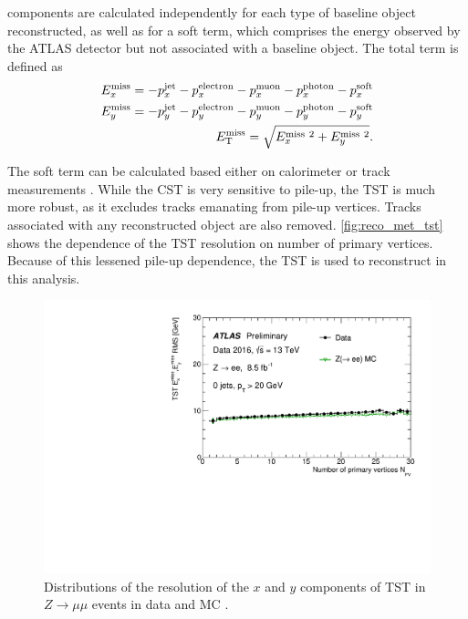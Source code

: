 \met components are calculated independently for each type of baseline object reconstructed, as well as for a soft term, which comprises the energy observed by the \ac{ATLAS} detector but not associated with a baseline object. The total \met term is defined as
%
\begin{eqnarray}
E_x^\mathrm{miss} =  - p_x^\mathrm{jet} - p_x^\mathrm{electron} - p_x^\mathrm{muon} - p_x^\mathrm{photon} - p_x^\mathrm{soft} \\
E_y^\mathrm{miss} = - p_y^\mathrm{jet} - p_y^\mathrm{electron} - p_y^\mathrm{muon} - p_y^\mathrm{photon} - p_y^\mathrm{soft} \\
E_{\text{T}}^{\text{miss}} = \sqrt{E_x^{\mathrm{miss}~2} + E_y^{\mathrm{miss}~2}}.
\end{eqnarray}

The soft term can be calculated based either on calorimeter or track measurements \cite{ATL-PHYS-PUB-2015-023}. While the \acf{CST} is very sensitive to pile-up, the \acf{TST} is much more robust, as it excludes tracks emanating from pile-up vertices. Tracks associated with any reconstructed object are also removed. \autoref{fig:reco_met_tst} shows the dependence of the \ac{TST} resolution on number of primary vertices. Because of this lessened pile-up dependence, the \ac{TST} is used to reconstruct \met in this analysis. 

\begin{centering}
\begin{figure}[!hbt]
\myfloatalign
\includegraphics[width=.9\linewidth]{figures/reco/mettst.pdf}
\caption{ Distributions of the resolution of the $x$ and $y$ components of \ac{TST} \met in $Z\rightarrow\mu\mu$ events in data and \ac{MC} \cite{JETM-2016-008}. }
\label{fig:reco_met_tst}
\end{figure}
\end{centering}

